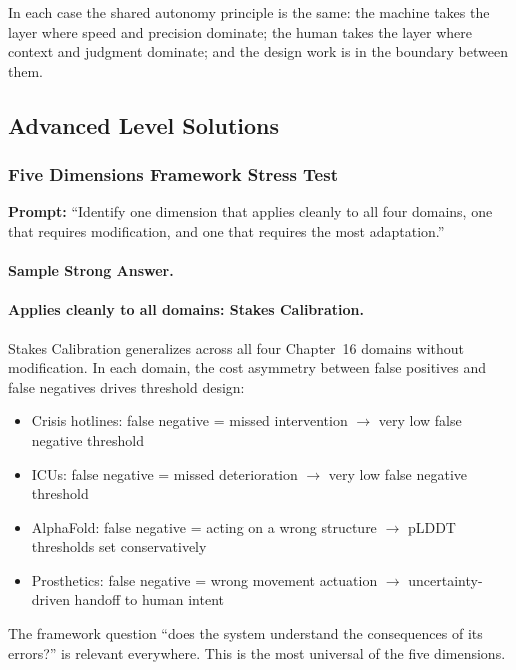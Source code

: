 In each case the shared autonomy principle is the same: the machine takes the layer where speed and precision dominate; the human takes the layer where context and judgment dominate; and the design work is in the boundary between them.

\subsection{Advanced Level Solutions}

\subsubsection{Five Dimensions Framework Stress Test}

\textbf{Prompt:} ``Identify one dimension that applies cleanly to all four domains, one that requires modification, and one that requires the most adaptation.''

\paragraph{Sample Strong Answer.}

\paragraph{Applies cleanly to all domains: Stakes Calibration.}

Stakes Calibration generalizes across all four Chapter~16 domains without modification. In each domain, the cost asymmetry between false positives and false negatives drives threshold design:
\begin{itemize}
    \item Crisis hotlines: false negative = missed intervention $\to$ very low false negative threshold
    \item ICUs: false negative = missed deterioration $\to$ very low false negative threshold
    \item AlphaFold: false negative = acting on a wrong structure $\to$ pLDDT thresholds set conservatively
    \item Prosthetics: false negative = wrong movement actuation $\to$ uncertainty-driven handoff to human intent
\end{itemize}

The framework question ``does the system understand the consequences of its errors?'' is relevant everywhere. This is the most universal of the five dimensions.

